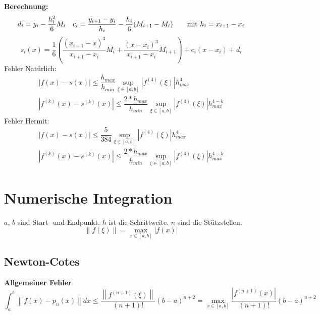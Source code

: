 \documentclass[
ngerman,
accentcolor=9c,%
type=intern,
marginpar=false
]{tudapub}
\begin{document}
            \textbf{Berechnung:}
            \begin{equation*}
                \begin{matrix}
                    d_i = y_i - \dfrac{h_i^2}{6}M_i & c_i = \dfrac{y_{i+1} - y_i}{h_i}- \dfrac{h_i}{6}(M_{i+1} - M_i) \tag*{mit $h_i = x_{i+1} - x_i$}
                \end{matrix}
            \end{equation*}
            \begin{equation*}
                s_i(x) = \dfrac{1}{6}
                \left(
                \dfrac{(x_{i+1} - x)^3}{x_{i+1} - x_i}M_i +
                \dfrac{(x - x_{i})^3}{x_{i+1} - x_i}M_{i+1}
                \right)
                + c_i (x-x_i) + d_i
            \end{equation*}
            Fehler Natürlich:
                \begin{align*}
                    |f(x) - s(x)| \leq \dfrac{h_{max}}{h_{min}} \sup_{\xi\in [a,b]} |f^{(4)}(\xi)| h^4_{max}\\
                    |f^{(k)}(x) - s^{(k)}(x)| \leq \dfrac{2*h_{max}}{h_{min}} \sup_{\xi\in [a,b]} |f^{(4)}(\xi)| h^{4-k}_{max}
                \end{align*}
            Fehler Hermit:
                \begin{align*}
                    |f(x) - s(x)| \leq \dfrac{5}{384} \sup_{\xi\in [a,b]} |f^{(4)}(\xi)| h^4_{max}\\
                    |f^{(k)}(x) - s^{(k)}(x)| \leq \dfrac{2*h_{max}}{h_{min}} \sup_{\xi\in [a,b]} |f^{(4)}(\xi)| h^{4-k}_{max}
                \end{align*}

    \newpage
    \section{Numerische Integration}
        $a$, $b$ sind Start- und Endpunkt.
        $h$ ist die Schrittweite.
        $n$ sind die Stützstellen.
        \begin{equation*}
            \left\| f(\xi)\right\| = \max_{x \in [a,b] } | f(x)|
        \end{equation*}
        \subsection{Newton-Cotes}
            \textbf{Allgemeiner Fehler}
            \begin{equation*}
                \int_a^b \left\| f(x)  - p_n(x) \right\| dx \leq \dfrac{\left\| f^{(n+1)}(\xi)\right\|}{(n+1)!}(b-a)^{n+2}
                = \max_{x \in [a,b] } \dfrac{ | f^{(n+1)}(x)| }{(n+1)!}(b-a)^{n+2}
            \end{equation*}
\end{document}
